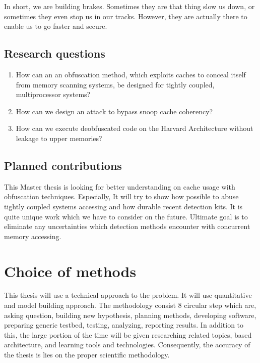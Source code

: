 In short, we are building brakes. Sometimes they are that thing slow us down, or sometimes they even stop us in our tracks. However, they are actually there to enable us to go faster and secure.

\subsection{Research questions}\label{research:questions}

\begin{enumerate}
	\item How can an an obfuscation method, which exploits caches to conceal itself from memory scanning systems, be designed for tightly coupled, multiprocessor systems?
	\item How can we design an attack to bypass snoop cache coherency?
	\item How can we execute deobfuscated code on the Harvard Architecture without leakage to upper memories?
\end{enumerate}


\subsection{Planned contributions}
This Master thesis is looking for better understanding on cache usage with obfuscation techniques. Especially, It will try to show how possible to abuse tightly coupled systems accessing and how durable recent detection kits. It is quite unique work which we have to consider on the future. Ultimate goal is to eliminate any uncertainties which detection methods encounter with concurrent memory accessing.

\section{Choice of methods}
	This thesis will use a technical approach to the problem. It will use quantitative and model building approach. The methodology consist 8 circular step which are, asking question, building new hypothesis, planning methods, developing software, preparing generic testbed, testing, analyzing, reporting results. In addition to this, the large portion of the time will be given researching related topics, based architecture, and learning tools and technologies. Consequently, the accuracy of the thesis is lies on the proper scientific methodology.



